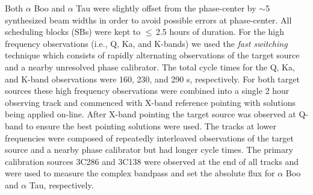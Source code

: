 \documentclass[iop]{emulateapj}
\begin{document}
Both $\alpha$ Boo and $\alpha$ Tau were slightly offset from the phase-center by $\sim$5 synthesized beam widths in order to avoid possible errors at phase-center. All scheduling blocks (SBs) were kept to $\le$\,2.5 hours of duration. For the high frequency observations (i.e., Q, Ka, and K-bands) we used the \textit{fast switching} technique which consists of rapidly alternating observations of the target source and a nearby unresolved phase calibrator. The total cycle times for the Q, Ka, and K-band observations were 160, 230, and 290 s, respectively. For both target sources these high frequency observations were combined into a single 2 hour observing track and commenced with X-band reference pointing with solutions being applied on-line. After X-band pointing the target source was observed at Q-band to ensure the best pointing solutions were used. The tracks at lower frequencies were composed of repeatedly interleaved observations of the target source and a nearby phase calibrator but had longer cycle times. The primary calibration sources 3C286 and 3C138 were observed at the end of all tracks and were used to measure the complex bandpass and set the absolute flux for $\alpha$ Boo and $\alpha$ Tau, respectively.  
\end{document}
